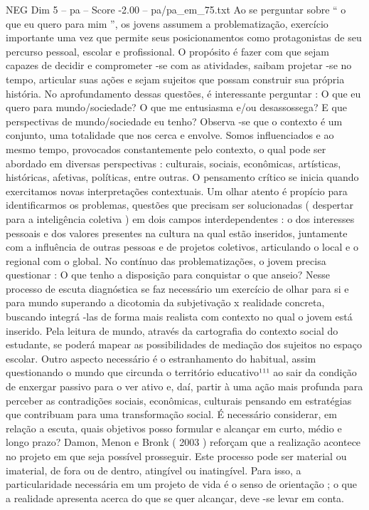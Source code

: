 \begin{textsample}{NEG Dim 5 – pa – Score -2.00 – pa/pa\_em\_75.txt}
Ao se perguntar sobre “ o que eu quero para mim ”, os jovens assumem a problematização, exercício importante uma vez que permite seus posicionamentos como protagonistas de seu percurso pessoal, escolar e profissional.
O propósito é fazer com que sejam capazes de decidir e comprometer -se com as atividades, saibam projetar -se no tempo, articular suas ações e sejam sujeitos que possam construir sua própria história.
No aprofundamento dessas questões, é interessante perguntar : O que eu quero para mundo/sociedade?
O que me entusiasma e/ou desassossega?
E que perspectivas de mundo/sociedade eu tenho?
Observa -se que o contexto é um conjunto, uma totalidade que nos cerca e envolve.
Somos influenciados e ao mesmo tempo, provocados constantemente pelo contexto, o qual pode ser abordado em diversas perspectivas : culturais, sociais, econômicas, artísticas, históricas, afetivas, políticas, entre outras.
O pensamento crítico se inicia quando exercitamos novas interpretações contextuais.
Um olhar atento é propício para identificarmos os problemas, questões que precisam ser solucionadas ( despertar para a inteligência coletiva ) em dois campos interdependentes : o dos interesses pessoais e dos valores presentes na cultura na qual estão inseridos, juntamente com a influência de outras pessoas e de projetos coletivos, articulando o local e o regional com o global.
No contínuo das problematizações, o jovem precisa questionar : O que tenho a disposição para conquistar o que anseio?
Nesse processo de escuta diagnóstica se faz necessário um exercício de olhar para si e para mundo superando a dicotomia da subjetivação x realidade concreta, buscando integrá -las de forma mais realista com contexto no qual o jovem está inserido.
Pela leitura de mundo, através da cartografia do contexto social do estudante, se poderá mapear as possibilidades de mediação dos sujeitos no espaço escolar.
Outro aspecto necessário é o estranhamento do habitual, assim questionando o mundo que circunda o território educativo¹¹¹ ao sair da condição de enxergar passivo para o ver ativo e, daí, partir à uma ação mais profunda para perceber as contradições sociais, econômicas, culturais pensando em estratégias que contribuam para uma transformação social.
É necessário considerar, em relação a escuta, quais objetivos posso formular e alcançar em curto, médio e longo prazo?
Damon, Menon e Bronk ( 2003 ) reforçam que a realização acontece no projeto em que seja possível prosseguir.
Este processo pode ser material ou imaterial, de fora ou de dentro, atingível ou inatingível.
Para isso, a particularidade necessária em um projeto de vida é o senso de orientação ; o que a realidade apresenta acerca do que se quer alcançar, deve -se levar em conta.

\end{textsample}
